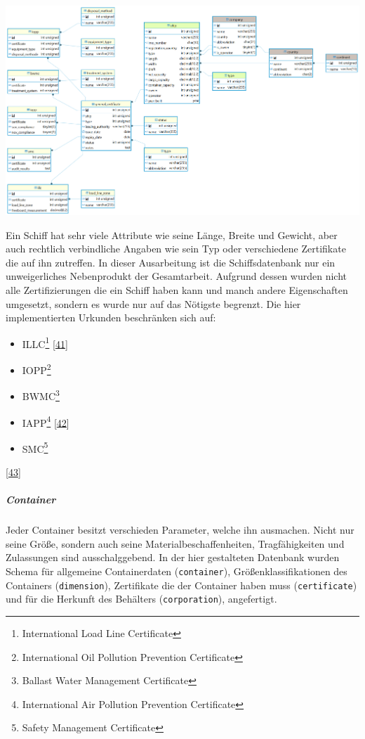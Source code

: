 \documentclass[
    headings=optiontotocandhead,%
    twoside,
    numbers=noenddot,%
    12pt, %
    titlepage, %
    parskip=full, %
    listof=leveldown, 
    numbers=noenddot, %
    a4paper,DIV=14,
    BCOR=15mm,
]{scrbook}
\newcommand{\passthrough}[1]{#1}
\let\origfigure=\figure
\let\endorigfigure=\endfigure
\renewenvironment{figure}[1][]{%
   \origfigure[H]
}{%
   \endorigfigure
}
\providecommand{\tightlist}{%
  \setlength{\itemsep}{0pt}\setlength{\parskip}{0pt}}
\begin{document}
\begin{figure}
\centering
\includegraphics[width=1\textwidth,height=\textheight]{img/Schrempf/ship-erd.png}
\caption{ERD der Schiffdatenbank}
\end{figure}

Ein Schiff hat sehr viele Attribute wie seine Länge, Breite und Gewicht,
aber auch rechtlich verbindliche Angaben wie sein Typ oder verschiedene
Zertifikate die auf ihn zutreffen. In dieser Ausarbeitung ist die
Schiffsdatenbank nur ein unweigerliches Nebenprodukt der Gesamtarbeit.
Aufgrund dessen wurden nicht alle Zertifizierungen die ein Schiff haben
kann und manch andere Eigenschaften umgesetzt, sondern es wurde nur auf
das Nötigste begrenzt. Die hier implementierten Urkunden beschränken
sich auf:

\begin{itemize}
\tightlist
\item
  ILLC\footnote{International Load Line Certificate}
  {[}\protect\hyperlink{ref-imo}{41}{]}
\item
  IOPP\footnote{International Oil Pollution Prevention Certificate}
\item
  BWMC\footnote{Ballast Water Management Certificate}
\item
  IAPP\footnote{International Air Pollution Prevention Certificate}
  {[}\protect\hyperlink{ref-iapp}{42}{]}
\item
  SMC\footnote{Safety Management Certificate}
\end{itemize}

{[}\protect\hyperlink{ref-gpt-schiff-db}{43}{]}

\hypertarget{container}{%
\subparagraph{Container}\label{container}}

Jeder Container besitzt verschieden Parameter, welche ihn ausmachen.
Nicht nur seine Größe, sondern auch seine Materialbeschaffenheiten,
Tragfähigkeiten und Zulassungen sind ausschalggebend. In der hier
gestalteten Datenbank wurden Schema für allgemeine Containerdaten
(\passthrough{\lstinline!container!}), Größenklassifikationen des
Containers (\passthrough{\lstinline!dimension!}), Zertifikate die der
Container haben muss (\passthrough{\lstinline!certificate!}) und für die
Herkunft des Behälters (\passthrough{\lstinline!corporation!}),
angefertigt.
\end{document}
